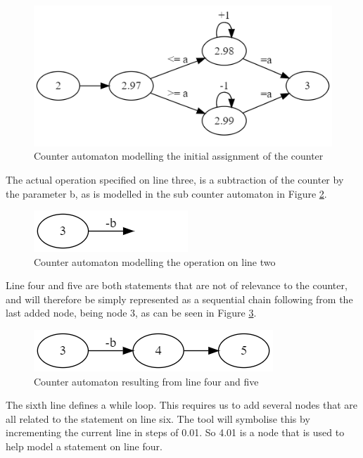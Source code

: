 \documentclass[12pt]{thesis}
\begin{document}
\begin{figure}[h]
	\centering
	\includegraphics[width=0.7\linewidth]{final_overview_3}
	\caption{Counter automaton modelling the initial assignment of the counter}
	\label{fig:final_overview_3}
\end{figure}

The actual operation specified on line three, is a subtraction of the counter by the parameter b, as is modelled in the sub counter automaton in Figure \ref{fig:final_overview_4}.

\begin{figure}[h]
	\centering
	\includegraphics[width=0.35\linewidth]{final_overview_4}
	\caption{Counter automaton modelling the operation on line two}
	\label{fig:final_overview_4}
\end{figure}

Line four and five are both statements that are not of relevance to the counter, and will therefore be simply represented as a sequential chain following from the last added node, being node 3, as can be seen in Figure \ref{fig:final_overview_5}.

\begin{figure}[h]
	\centering
	\includegraphics[width=0.5\linewidth]{final_overview_5}
	\caption{Counter automaton resulting from line four and five}
	\label{fig:final_overview_5}
\end{figure}

The sixth line defines a while loop. This requires us to add several nodes that are all related to the statement on line six. The tool will symbolise this by incrementing the current line in steps of 0.01. So 4.01 is a node that is used to help model a statement on line four.
\end{document}
